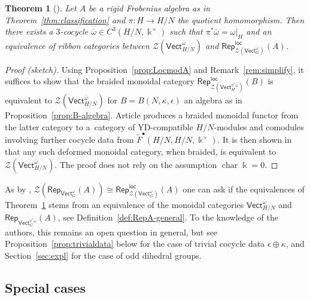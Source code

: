 \documentclass[10pt,a4paper]{amsart}
\numberwithin{equation}{section}
\newtheorem{Theorem}{Theorem}[section]
\newcommand{\ov}[1]{\overline{#1}}
\newcommand{\cha}{\operatorname{char}}
\newcommand{\wF}{\widetilde{F}}
\newcommand{\Rep}{\mathsf{Rep}}
\newcommand{\locmod}{\mathsf{Rep}^{\mathsf{loc}}}
\newcommand{\Vect}{\mathsf{Vect}}
\newcommand{\cZ}{\mathcal{Z}}
\begin{document}
\begin{Theorem}[{\cite[Theorem~3.16]{DS}}]\label{thm:DSlocal}
Let $A$ be a rigid Frobenius algebra as in Theorem~{\rm \ref{thm:classification}} and $\pi\colon H\to H/N$ the quotient homomorphism. Then there exists a $3$-cocycle $\ov{\omega}\in C^3(H/N, \Bbbk^\times)$ such that $\pi^*\ov{\omega}=\omega|_{H}$ and an equivalence of ribbon categories
between $\cZ(\Vect^{\ov{\omega}}_{H/N})$ and $\locmod_{\cZ(\Vect_G^\omega)}(A)$.
\end{Theorem}
\begin{proof}[Proof (sketch)]
Using Proposition~\ref{prop:LocmodA} and Remark~\ref{rem:simplify}, it suffices to show that the braided monoidal category $\locmod_{\cZ(\Vect_H^{\pi^*\ov{\omega}})}(B)$ is equivalent to $\cZ(\Vect_{H/N}^{\ov{\omega}})$ for $B=B(N,\kappa,\epsilon)$ an algebra as in Proposition~\ref{prop:B-algebra}. Article \cite{DS} produces a braided monoidal functor from the latter category to a~category of YD-compatible $H/N$-modules and comodules involving further cocycle data from $\wF^\bullet(H/N,H/N,\Bbbk^\times)$. It is then shown in \cite[Proposition A.1]{DS} that any such deformed monoidal category, when braided, is equivalent to $\cZ(\Vect_{H/N}^{\ov{\omega}})$. The proof does not rely on the assumption $\cha \Bbbk=0$.
\end{proof}

As by \cite{Sch}, $\cZ(\Rep_{\Vect_{G}^{\omega}}(A))\cong \locmod_{\cZ(\Vect_{G}^{\omega})}(A)$ one can ask if the equivalences of Theorem~\ref{thm:DSlocal} stems from an equivalence of the monoidal categories
$\Vect_{H/N}^{\ov{\omega}}$ and $\Rep_{\Vect_{G}^{\pi^*\ov{\omega}}}(A)$, see Definition~\ref{def:RepA-general}.
To the knowledge of the authors, this remains an open question in general, but see Proposition~\ref{prop:trivialdata} below for the case of trivial cocycle data $\epsilon\oplus\kappa $, and Section~\ref{sec:expl} for the case of odd dihedral groups.

\subsection{Special cases}
\end{document}
